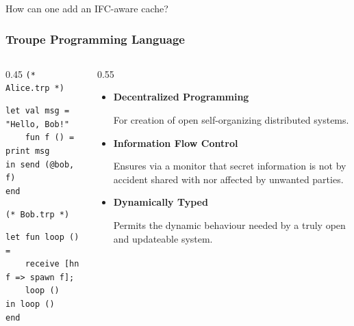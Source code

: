 \documentclass[english, aspectratio=169]{beamer}
\begin{document}
\begin{frame}
  \begin{center}
    \LARGE\bf

    {\color{gray}How can one add an} {IFC-aware} {\color{gray}cache?}
  \end{center}
\end{frame}


\begin{frame}[fragile]
  \frametitle{Troupe Programming Language}

  \begin{columns}
    \begin{column}{0.45\linewidth}
      {\color{gray} \texttt{(* Alice.trp *)}}
      \begin{lstlisting}[language=troupe]
let val msg = "Hello, Bob!"
    fun f () = print msg
in send (@bob, f)
end
      \end{lstlisting}

      {\color{gray} \texttt{(* Bob.trp *)}}
      \begin{lstlisting}[language=troupe, firstnumber=last]
let fun loop () =
    receive [hn f => spawn f];
    loop ()
in loop ()
end
      \end{lstlisting}
    \end{column}
    \begin{column}{0.55\linewidth}
      \begin{itemize}
      \item \textbf{Decentralized Programming}

        For creation of open self-organizing distributed systems.

      \item \textbf{Information Flow Control}

        Ensures via a monitor that secret information is not by accident shared
        with nor affected by unwanted parties.

      \item \textbf{Dynamically Typed}

        Permits the dynamic behaviour needed by a truly open and updateable
        system.

      \end{itemize}
    \end{column}
  \end{columns}
\end{frame}
\end{document}
